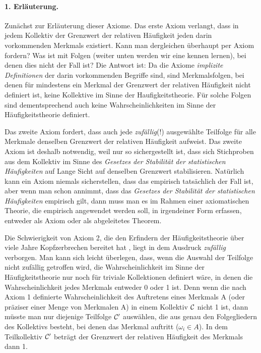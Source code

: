 \paragraph{1. Erläuterung.} Zunächst zur Erläuterung dieser Axiome. Das erste
Axiom verlangt, dass in jedem Kollektiv der Grenzwert der relativen Häufigkeit 
jeden darin vorkommenden
Merkmals existiert. Kann man dergleichen überhaupt per Axiom fordern? Was ist
mit Folgen (weiter unten werden wir eine kennen lernen), bei denen dies nicht der Fall ist? 
Die Antwort ist: Da die Axiome {\em implizite Definitionen} der darin
vorkommenden Begriffe sind, sind Merkmalsfolgen, bei denen für mindestens ein
Merkmal der Grenzwert der relativen Häufigkeit nicht definiert ist, keine
Kollektive im Sinne der Haufigkeitstheorie. Für solche Folgen sind
dementsprechend auch keine Wahrscheinlichkeiten im Sinne der Häufigkeitstheorie
definiert.

Das zweite Axiom fordert, dass auch jede {\em zufällig}(!) ausgewählte
Teilfolge für alle Merkmale denselben Grenzwert der relativen Häufigkeit
aufweist. Das zweite Axiom ist deshalb notwendig, weil nur so sichergestellt
ist, dass sich Stichproben aus dem Kollektiv im Sinne des {\em Gesetzes der
Stabilität der statistischen Häufigkeiten} auf Lange Sicht auf denselben
Grenzwert stabilisieren. Natürlich kann ein Axiom niemals sicherstellen, dass
das empirisch tatsächlich der Fall ist, aber wenn man schon annimmt, dass das 
 {\em Gesetzes der Stabilität der statistischen Häufigkeiten} empirisch gilt,
 dann muss man es im Rahmen einer axiomatischen Theorie, die empirisch
 angewendet werden soll, in irgendeiner Form erfassen, entweder als Axiom oder
 als abgeleitetes Theorem.
 
 Die Schwierigkeit von Axiom 2, die den Erfindern der Häufigkeitstheorie über
 viele Jahre Kopfzerbrechen bereitet hat \cite[S. 105ff.]{gillies:2000}, liegt
 in dem Ausdruck {\em zufällig} verborgen. Man kann sich leicht überlegen,
 dass, wenn die Auswahl der Teilfolge nicht zufällig getroffen wird, die
 Wahrscheinlichkeit im Sinne der Häufigkeitstheorie nur noch für triviale
 Kollektionen definiert wäre, in denen die Wahrscheinlichkeit jedes Merkmals
 entweder 0 oder 1 ist. Denn wenn die nach Axiom 1 definierte
 Wahrscheinlichkeit des Auftretens eines Merkmals A (oder präziser einer Menge
 von Merkmalen A) in einem Kollektiv ${\cal C}$ nicht 1 ist, dann müsste man nur
 diejenige Teilfolge ${\cal C'}$ auswählen, die aus genau den Folgegliedern 
 des Kollektivs besteht, bei denen das Merkmal
 auftritt ($\omega_i \in A$). In dem Teilkollektiv ${\cal C'}$ beträgt der
 Grenzwert der relativen Häufigkeit des Merkmals dann 1. 
 

